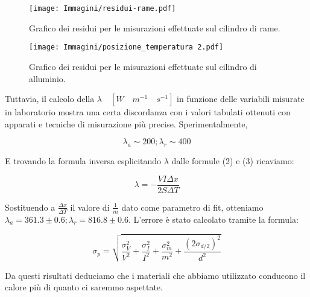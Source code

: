 \documentclass{article}
\begin{document}
\begin{figure} [t]
    \centering
    \texttt{[image: Immagini/residui-rame.pdf]}
    \caption{Grafico dei residui per le misurazioni effettuate sul cilindro di rame.}
    \label{fig:residui-rame}
\end{figure}

\FloatBarrier

\begin{figure} [h]
    \centering
    \texttt{[image: Immagini/posizione\_temperatura 2.pdf]}
    \caption{Grafico dei residui per le misurazioni effettuate sul cilindro di alluminio.}
    \label{fig:residui-alluminio}
\end{figure}

\FloatBarrier

\noindent Tuttavia, il calcolo della $\lambda \quad [W \quad m^{-1} \quad s^
{-1}]$ in funzione delle variabili misurate in laboratorio mostra una certa discordanza con i valori tabulati ottenuti con apparati e tecniche di misurazione più precise. Sperimentalmente,

\begin{equation}
    \lambda_a \sim {200}; \lambda_r \sim {400}
\end{equation}

\noindent E trovando la formula inversa esplicitando $\lambda$ dalle formule (2) e (3) ricaviamo:

\begin{equation}
    \lambda = -\frac{VI\Delta x}{2S\Delta T}
\end{equation}

\noindent Sostituendo a $\frac{\Delta x}{\Delta T}$ il valore di $\frac{1}{m}$ dato come parametro di fit, otteniamo $\lambda_a = 361.3 \pm 0.6; \lambda_r = 816.8 \pm 0.6$. L'errore è stato calcolato tramite la formula:

\begin{equation}
    \sigma_p = \sqrt{\frac{\sigma_V ^ {2}}{V^ {2}} + \frac{\sigma_I ^ {2}}{I^ {2}} + \frac{\sigma_m ^ {2}}{m^ {2}} + \frac{(2\sigma_{d/2}) ^ {2}}{d^ {2}}}
\end{equation}

Da questi risultati deduciamo che i materiali che abbiamo utilizzato conducono il calore più di quanto ci saremmo aspettate.
\end{document}
